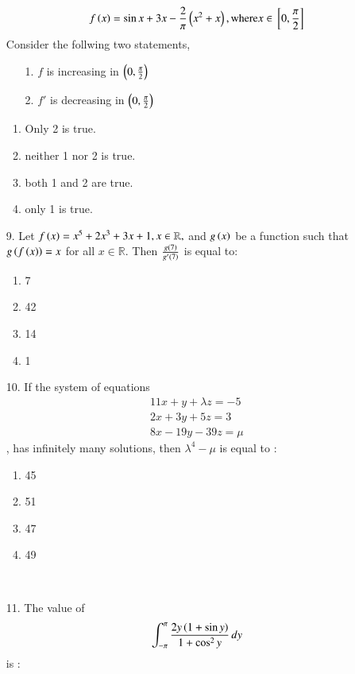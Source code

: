 \documentclass[journal,12pt,onecolumn]{IEEEtran}
\theoremstyle{remark}
\begin{document}
\begin{enumerate}
\begin{align}
        f\left(x\right) = \sin x + 3x - \frac{2}{\pi}\left(x^2 + x\right), \textnormal{where} x \in {}\left[0, \frac{\pi}{2}\right]
	\end{align} 
    Consider the follwing two statements,
    \begin{enumerate}
        \item[1.] $f$ is increasing in $\left(0, \frac{\pi}{2}\right)$
        \item[2.] $f'$ is decreasing in $\left(0, \frac{\pi}{2}\right)$
    \end{enumerate}
		\hfill{}
		\begin{enumerate}
			\item Only 2 is true.
			\item  neither 1 nor 2 is true.
			\item  both 1 and 2 are true.
			\item only 1 is true.
		\end{enumerate}
    \item[9.] Let $f\left(x\right) = x^5 + 2x^3 + 3x + 1, x \in \mathbb{R},$ and $g\left(x\right)$ be a function 
        such that $g\left(f\left(x\right)\right) = x$ for all $x \in \mathbb{R}$. Then $\frac{g\left(7\right)}{g'\left(7\right)}$
        is equal to:
		\hfill{}
        \begin{multicols}{4}
            
		\begin{enumerate}
			\item 7 \columnbreak
			\item 42 \columnbreak 
			\item 14 \columnbreak
			\item 1
		\end{enumerate}
        \end{multicols}
\item[10.] If the system of equations 
		\begin{align}
            11x + y + \lambda z = -5 \\
            2x + 3y + 5z = 3 \\
            8x - 19y - 39z = \mu
		\end{align}, has infinitely many solutions, then $\lambda ^ 4 - \mu$ is equal to :
        \hfill{}
		\begin{multicols}{4}
		\begin{enumerate}
			\item 45 \columnbreak
			\item 51 \columnbreak 
			\item 47 \columnbreak
			\item 49
		\end{enumerate}
        \end{multicols}
		\
\item[11.] The value of 
    \begin{align}
        \int_{-\pi} ^{\pi} \frac{2y\left(1 + \sin y\right)}{1 + \cos ^2 y} \, dy 
    \end{align} is :
		\hfill{}
		

\end{enumerate}
\end{document}
